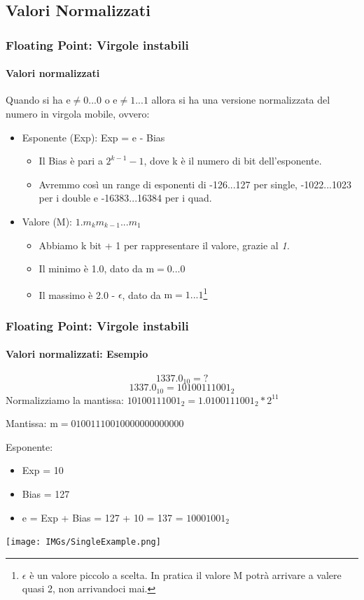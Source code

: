 \documentclass{beamer}
\begin{document}
	  \subsection{Valori Normalizzati}
	  \begin{frame}
	    \frametitle{Floating Point: Virgole instabili}
	    \framesubtitle{Valori normalizzati}
	    Quando si ha $\text{e} \neq 0\text{...}0$ o $\text{e} \neq 1\text{...}1$ allora si ha una
	    versione normalizzata del numero in virgola mobile, ovvero:
	    
	    \begin{itemize}
	      \item Esponente (Exp): Exp = e - Bias
	      		\begin{itemize}
	      			\item Il Bias è pari a $2^{k-1} - 1$, dove k è il numero di bit dell'esponente.
	      			\item Avremmo così un range di esponenti di -126...127 per single, -1022...1023 per i double e
	      				-16383...16384 per i quad.
	      		\end{itemize}
	      \item Valore (M): $1.m_{k}m_{k-1}...m_{1}$
	      		\begin{itemize}
	      			\item Abbiamo k bit + 1 per rappresentare il valore, grazie al \emph{1.}
	      			\item Il minimo è 1.0, dato da $\text{m} = 0\text{...}0$
	      			\item Il massimo è 2.0 - $\epsilon$, dato da $\text{m} = 1\text{...}1$\footnote{$\epsilon$ è un valore
	      				piccolo a scelta. In pratica il valore M potrà arrivare a valere quasi 2, non arrivandoci mai.}
	      		\end{itemize}
	    \end{itemize}
	  \end{frame}
	  \begin{frame}
	    \frametitle{Floating Point: Virgole instabili}
	    \framesubtitle{Valori normalizzati: Esempio}
	    		$$1337.0_{10} = ?$$
	    		\vspace{1em}
	    		\pause
	    		$$1337.0_{10} = 10100111001_{2}$$
	    		Normalizziamo la mantissa: $10100111001_{2} = 1.0100111001_{2}*2^{11}$
	    	  
	    	  Mantissa: $\text{m} = 01001110010000000000000$
	    	  
	    	  Esponente:
	    	  \begin{itemize}
	    	  		\item Exp = 10
	    	  		\item Bias = 127
	    	  		\item e = Exp + Bias = 127 + 10 = 137 = $10001001_{2}$
	    	  \end{itemize}
	    	  
	    	  \vspace{1em}
	    	  \pause
	    	  \begin{center}
					\texttt{[image: IMGs/SingleExample.png]}
				\end{center}
	  \end{frame}
\end{document}
